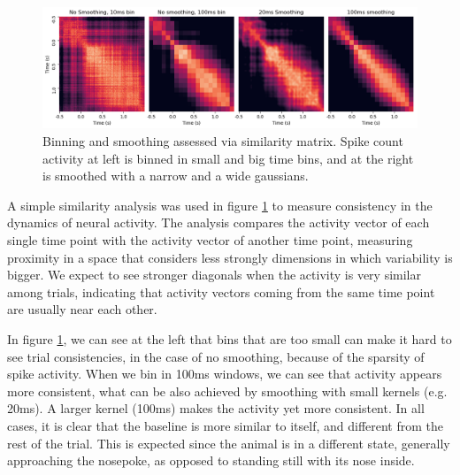     \begin{figure}
        \centering
        \includegraphics[width=\textwidth]{figures/similarity_comparison.png}
        \caption[Binning and smoothing assessed via similarity matrix]{Binning and smoothing assessed via similarity matrix. Spike count activity at left is binned in small and big time bins, and at the right is smoothed with a narrow and a wide gaussians.}
        \label{fig:mahalanobis_smoothing} 
    \end{figure} %
    
    A simple similarity analysis was used in figure \ref{fig:mahalanobis_smoothing} to measure consistency in the dynamics of neural activity. The analysis compares the activity vector of each single time point with the activity vector of another time point, measuring proximity in a space that considers less strongly dimensions in which variability is bigger. We expect to see stronger diagonals when the activity is very similar among trials, indicating that activity vectors coming from the same time point are usually near each other.
    
    In figure \ref{fig:mahalanobis_smoothing}, we can see at the left that bins that are too small can make it hard to see trial consistencies, in the case of no smoothing, because of the sparsity of spike activity. When we bin in 100ms windows, we can see that activity appears more consistent, what can be also achieved by smoothing with small kernels (e.g. 20ms). A larger kernel (100ms) makes the activity yet more consistent. 
    In all cases, it is clear that the baseline is more similar to itself, and different from the rest of the trial. This is expected since the animal is in a different state, generally approaching the nosepoke, as opposed to standing still with its nose inside. 

